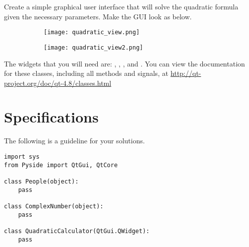 \begin{problem}
Create a simple graphical user interface that will solve the quadratic formula given the necessary parameters.
Make the GUI look as below.
\begin{figure}[H]
\centering
\begin{subfigure}[b]{.49\textwidth}
\texttt{[image: quadratic\_view.png]}
\end{subfigure}
\begin{subfigure}[b]{.49\textwidth}
\texttt{[image: quadratic\_view2.png]}
\end{subfigure}
\end{figure}
The widgets that you will need are: , , , and .
You can view the documentation for these classes, including all methods and signals, at \url{http://qt-project.org/doc/qt-4.8/classes.html}
\label{prob:quadCalc}
\end{problem}


\section*{Specifications}

The following is a guideline for your solutions.

\begin{lstlisting}
import sys
from Pyside import QtGui, QtCore

class People(object):
	pass
	
class ComplexNumber(object):
	pass
	
class QuadraticCalculator(QtGui.QWidget):
	pass
\end{lstlisting}


